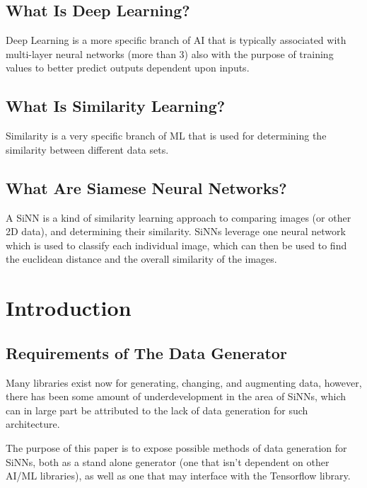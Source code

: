 \documentclass[
	letterpaper, %
	10pt, %
	unnumberedsections, %
	twoside, %
]{LTJournalArticle}
\begin{document}
\subsection{What Is Deep Learning?}
Deep Learning is a more specific branch of AI that is typically associated with multi-layer neural networks (more than 3) also with the purpose of training values to better predict outputs dependent upon inputs.

\subsection{What Is Similarity Learning?}
Similarity is a very specific branch of ML that is used for determining the similarity between different data sets\autocite{what_is_similarity_learning}.

\subsection{What Are Siamese Neural Networks?}
A SiNN is a kind of similarity learning approach to comparing images (or other 2D data), and determining their similarity. SiNNs leverage one neural network which is used to classify each individual image, which can then be used to find the euclidean distance and the overall similarity of the images.


\section{Introduction}

\subsection{Requirements of The Data Generator}
Many libraries exist now for generating, changing, and augmenting data, however, there has been some amount of underdevelopment in the area of SiNNs, which can in large part be attributed to the lack of data generation for such architecture.

The purpose of this paper is to expose possible methods of data generation for SiNNs, both as a stand alone generator (one that isn't dependent on other AI/ML libraries), as well as one that may interface with the Tensorflow library.
\end{document}
